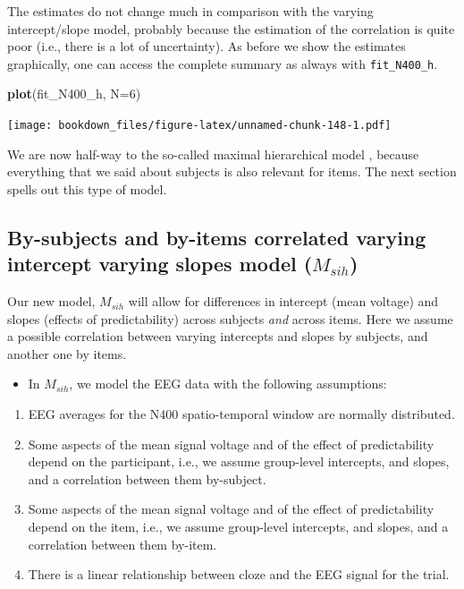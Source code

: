 \documentclass[12pt,]{krantz}
\newenvironment{Shaded}{\begin{snugshade}}{\end{snugshade}}
\newcommand{\KeywordTok}[1]{\textcolor[rgb]{0.13,0.29,0.53}{\textbf{#1}}}
\newcommand{\DataTypeTok}[1]{\textcolor[rgb]{0.13,0.29,0.53}{#1}}
\newcommand{\DecValTok}[1]{\textcolor[rgb]{0.00,0.00,0.81}{#1}}
\newcommand{\NormalTok}[1]{#1}
\providecommand{\tightlist}{%
  \setlength{\itemsep}{0pt}\setlength{\parskip}{0pt}}
\theoremstyle{definition}
\theoremstyle{definition}
\theoremstyle{definition}
\theoremstyle{remark}
\begin{document}
The estimates do not change much in comparison with the varying
intercept/slope model, probably because the estimation of the
correlation is quite poor (i.e., there is a lot of uncertainty). As
before we show the estimates graphically, one can access the complete
summary as always with \texttt{fit\_N400\_h}.

\begin{Shaded}
\begin{Highlighting}[]
\KeywordTok{plot}\NormalTok{(fit_N400_h, }\DataTypeTok{N=}\DecValTok{6}\NormalTok{)}
\end{Highlighting}
\end{Shaded}

\texttt{[image: bookdown\_files/figure-latex/unnamed-chunk-148-1.pdf]}

We are now half-way to the so-called maximal hierarchical model
\citep{barr2013}, because everything that we said about subjects is also
relevant for items. The next section spells out this type of model.

\subsection{\texorpdfstring{By-subjects and by-items correlated varying
intercept varying slopes model
(\(M_{sih}\))}{By-subjects and by-items correlated varying intercept varying slopes model (M\_\{sih\})}}\label{sec:sih}

Our new model, \(M_{sih}\) will allow for differences in intercept (mean
voltage) and slopes (effects of predictability) across subjects
\emph{and} across items. Here we assume a possible correlation between
varying intercepts and slopes by subjects, and another one by items.

\begin{itemize}
\tightlist
\item
  In \(M_{sih}\), we model the EEG data with the following assumptions:
\end{itemize}

\begin{enumerate}
\def\labelenumi{\arabic{enumi}.}
\tightlist
\item
  EEG averages for the N400 spatio-temporal window are normally
  distributed.
\item
  Some aspects of the mean signal voltage and of the effect of
  predictability depend on the participant, i.e., we assume group-level
  intercepts, and slopes, and a correlation between them by-subject.
\item
  Some aspects of the mean signal voltage and of the effect of
  predictability depend on the item, i.e., we assume group-level
  intercepts, and slopes, and a correlation between them by-item. 
\item
  There is a linear relationship between cloze and the EEG signal for
  the trial.
\end{enumerate}
\end{document}
